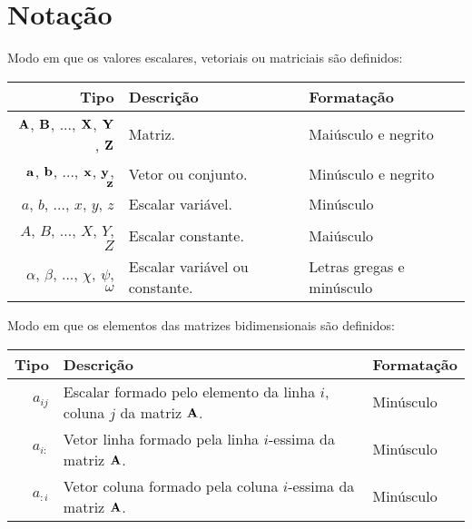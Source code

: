
\chapter{Notação}


\begin{notation}Modo em que os valores escalares, vetoriais ou matriciais são definidos:\\
\begin{tabular}{r | p{.4\linewidth} | l}
\hline	
Tipo & Descrição & Formatação \\ \hline
$\MATRIX{A}$, $\MATRIX{B}$, ..., $\MATRIX{X}$, $\MATRIX{Y}$, $\MATRIX{Z}$& Matriz. & Maiúsculo e negrito \\
$\VECTOR{a}$, $\VECTOR{b}$, ..., $\VECTOR{x}$, $\VECTOR{y}$, $\VECTOR{z}$ & Vetor ou conjunto. & Minúsculo e negrito \\
$a$, $b$, ..., $x$, $y$, $z$ & Escalar variável. & Minúsculo \\
$A$, $B$, ..., $X$, $Y$, $Z$ & Escalar constante. & Maiúsculo \\
$\alpha$, $\beta$, ..., $\chi$, $\psi$, $\omega$ & Escalar variável ou constante. & Letras gregas e minúsculo  \\ \hline
\end{tabular}
\end{notation}

\begin{notation}Modo em que os elementos das matrizes bidimensionais são definidos:\\
\begin{tabular}{r | p{.6\linewidth} | l}
\hline	
Tipo & Descrição & Formatação \\ \hline
$a_{ij}$ & Escalar formado pelo elemento da linha $i$, coluna $j$ da matriz $\MATRIX{A}$. & Minúsculo \\ \hline
$a_{i:}$ & Vetor linha formado pela linha $i$-essima da matriz $\MATRIX{A}$.  & Minúsculo \\
$a_{:i}$ & Vetor coluna formado pela coluna $i$-essima da matriz $\MATRIX{A}$.  & Minúsculo \\
\end{tabular}
\end{notation}


